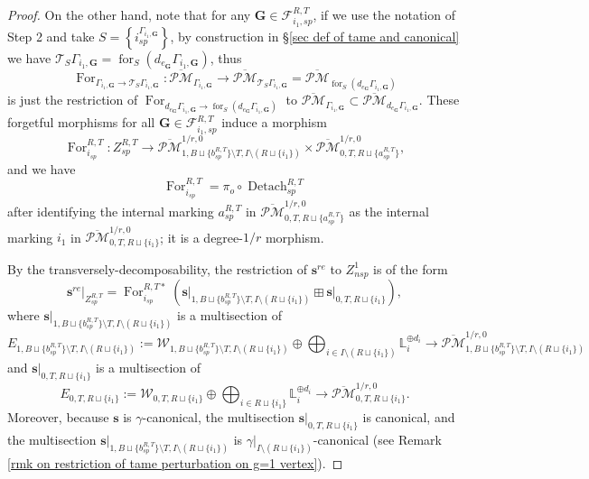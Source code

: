 \documentclass[11pt]{amsart}
\theoremstyle{definition}
\theoremstyle{remark}
\newcommand{\oPMb}{{\overline{\mathcal{PM}}}}
\newcommand{\<}{\left<}
\renewcommand{\>}{\right>}
\numberwithin{equation}{section}
\begin{document}
\begin{proof}
         On the other hand, note that for any $\bm{G}\in \mathcal F_{i_1,sp}^{R,T}$, if we use the notation of Step 2 and take $S=\left\{i_{sp}^{\Gamma_{i_1,\bm{G}}}\right\}$, by construction in \S \ref{sec def of tame and canonical} we have 
         $\mathcal T_{S}\Gamma_{i_1,\bm{G}}=\operatorname{for}_{S}(d_{e_{\bm{G}}}\Gamma_{i_1,\bm{G}})$, thus 
         $$
         \operatorname{For}_{\Gamma_{i_1,\bm{G}}\to \mathcal T_{S}\Gamma_{i_1,\bm{G}}}\colon \oPMb_{\Gamma_{i_1,\bm{G}}}\to \oPMb_{\mathcal T_{S}\Gamma_{i_1,\bm{G}}}=\oPMb_{\operatorname{for}_{S}(d_{e_{\bm{G}}}\Gamma_{i_1,\bm{G}})}
         $$ 
         is just the restriction of 
         $\operatorname{For}_{d_{e_{\bm{G}}}\Gamma_{i_1,\bm{G}}\to \operatorname{for}_{S}(d_{e_{\bm{G}}}\Gamma_{i_1,\bm{G}})}$ to $\oPMb_{\Gamma_{i_1,\bm{G}}}\subset \oPMb_{d_{e_{\bm{G}}}\Gamma_{i_1,\bm{G}}}$. These forgetful morphisms for all $\bm{G}\in \mathcal F_{i_1,sp}^{R,T}$ induce a morphism
         $$
         \operatorname{For}_{i_{sp}}^{R,T}\colon Z_{sp}^{R,T}\to \oPMb^{1/r,0}_{1,B\sqcup \{b^{R,T}_{sp}\} \setminus T,I\setminus (R\sqcup \{i_1\})} \times \oPMb^{1/r,0}_{0,T,R\sqcup \{a^{R,T}_{sp}\}},
         $$
         and we have 
         $$
         \operatorname{For}_{i_{sp}}^{R,T}=\pi_o\circ  \operatorname{Detach}_{sp}^{R,T}
         $$
         after identifying the internal marking $a^{R,T}_{sp}$ in $ \oPMb^{1/r,0}_{0,T,R\sqcup \{a^{R,T}_{sp}\}}$ as the internal marking $i_1$ in $ \oPMb^{1/r,0}_{0,T,R\sqcup \{i_1\}}$; it is a degree-$1/r$ morphism. 
         
         
         By the transversely-decomposability, the restriction of $\bm{s}^{re}$ to ${Z}^1_{nsp}$ is of the form
         \begin{equation}\label{eq split of remaining section at sp locus}
         \bm{s}^{re}\vert_{Z_{sp}^{R,T}}= \operatorname{For}_{i_{sp}}^{R,T*} \left( \bm{s}\vert_{1,B\sqcup \{b^{R,T}_{sp}\} \setminus T,I\setminus (R\sqcup \{i_1\})} \boxplus \bm{s}\vert_{0,T,R\sqcup \{i_1\}} \right),
         \end{equation}
         where $\bm{s}\vert_{1,B\sqcup \{b^{R,T}_{sp}\} \setminus T,I\setminus (R\sqcup \{i_1\})}$ is a multisection of 
         $$
         E_{1,B\sqcup \{b^{R,T}_{sp}\} \setminus T,I\setminus (R\sqcup \{i_1\})} := \mathcal W_{1,B\sqcup \{b^{R,T}_{sp}\} \setminus T,I\setminus (R\sqcup \{i_1\})}\oplus \bigoplus_{i\in I\setminus (R\sqcup \{i_1\})} \mathbb L_i^{\oplus d_i}\to \oPMb^{1/r,0}_{1,B\sqcup \{b^{R,T}_{sp}\} \setminus T,I\setminus (R\sqcup \{i_1\})}
         $$
         and 
          $\bm{s}\vert_{0,T,R\sqcup \{i_1\}}$ is a multisection of 
         $$
         E_{0,T,R\sqcup \{i_1\}} := \mathcal W_{0,T,R\sqcup \{i_1\}} \oplus \bigoplus_{i \in R\sqcup \{i_1\}} \mathbb L_i^{\oplus d_i}\to \oPMb^{1/r,0}_{0,T,R\sqcup \{i_1\}}.
         $$
         Moreover, because $\bm{s}$ is $\gamma$-canonical, the multisection $\bm{s}\vert_{0,T,R\sqcup \{i_1\}}$ is canonical, and the multisection $\bm{s}\vert_{1,B\sqcup \{b^{R,T}_{sp}\} \setminus T,I\setminus (R\sqcup \{i_1\})}$ is $\gamma\vert_{I\setminus (R\sqcup \{i_1\})}$-canonical (see Remark \ref{rmk on restriction of tame perturbation on g=1 vertex}).


\end{proof}
\end{document}

